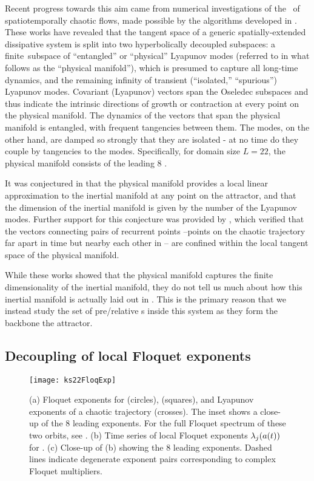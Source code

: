 Recent progress towards this aim came from numerical investigations of
the \cLvs\
of spatiotemporally chaotic flows, made
possible by the
algorithms developed in .
These works have revealed that the tangent space
of a generic spatially-extended dissipative system is split into two
hyperbolically decoupled subspaces: a finite\dmn\ subspace of
``entangled'' or ``physical'' Lyapunov modes (referred to in what follows
as the ``physical manifold''), which is presumed to capture all long-time
dynamics, and the remaining infinity of transient (``isolated,''
``spurious'') Lyapunov modes.
Covariant (Lyapunov) vectors span the Oseledec
subspaces and thus indicate the intrinsic
directions of growth or contraction at every point on the
physical manifold.
The dynamics of the vectors that span the physical manifold is entangled,
with frequent tangencies between them.
The {\transient} modes, on the other hand, are damped so strongly
that they are isolated - at no time do they couple by
tangencies to the {\entangled} modes.
Specifically, for domain size $L=22$,
the physical manifold consists of the leading 8 \cLvs.

It was conjectured in  that the physical
manifold provides a local linear approximation to the inertial manifold
at any point on the attractor, and that the dimension of the inertial
manifold is given by the number of the {\entangled} Lyapunov modes.
Further
support for this conjecture was provided by
, which verified that the vectors connecting pairs of
recurrent points --points on the chaotic trajectory far apart in time but
nearby each other in \statesp-- are confined within the local tangent
space of the physical manifold.

While these works showed that the physical manifold captures the
finite dimensionality of the inertial manifold, they do not tell us
much about how this inertial manifold is actually laid out in \statesp.
This is the primary reason that we instead study the set of pre/relative
\po s inside this system as they form the backbone the attractor.

\subsection{Decoupling of local Floquet exponents}

\begin{figure}[!ht]
  \centering
  \texttt{[image: ks22FloqExp]}
  \caption[Local Floquet exponents of .]{
    (a) Floquet exponents for  (circles),
     (squares), and Lyapunov exponents of a
    chaotic trajectory (crosses).
    The inset shows a close-up of the 8 leading exponents.
    For the full Floquet spectrum of these two orbits, see
    .
    (b) Time series of local Floquet exponents
    $\lambda_j(a(t))$ for .
    (c) Close-up of (b) showing the 8 leading exponents.
    Dashed lines indicate degenerate exponent pairs corresponding to
    complex Floquet multipliers.
  }
  \label{fig:ks22FloqExp}
\end{figure}


